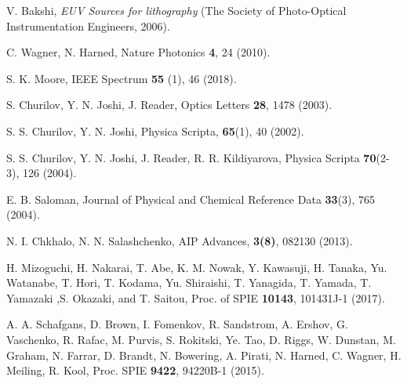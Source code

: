 \documentclass[aip, apl, amsmath,amssymb, reprint]{revtex4-1}
\begin{document}
\begin{thebibliography}{6}

%
V. Bakshi, \emph{EUV Sources for lithography} (The Society of Photo-Optical Instrumentation Engineers, 2006).

C. Wagner, N. Harned, Nature Photonics \textbf{4}, 24 (2010).

 S. K. Moore, IEEE Spectrum \textbf{55} (1), 46 (2018).

S. Churilov, Y. N. Joshi, J. Reader,  Optics Letters \textbf{28}, 1478 (2003).

S. S. Churilov, Y. N. Joshi, Physica Scripta, \textbf{65}(1), 40 (2002).

S. S. Churilov, Y. N. Joshi, J. Reader, R. R. Kildiyarova,  Physica Scripta \textbf{70}(2-3), 126 (2004).

E. B. Saloman, Journal of Physical and Chemical Reference Data \textbf{33}(3), 765 (2004).

N. I. Chkhalo, N. N. Salashchenko, AIP Advances, \textbf{3(8)}, 082130 (2013).


H. Mizoguchi, H. Nakarai, T. Abe, K. M. Nowak, Y. Kawasuji, H. Tanaka, Yu. Watanabe, T. Hori, T. Kodama, Yu. Shiraishi, T. Yanagida, T. Yamada, T. Yamazaki ,S. Okazaki, and T. Saitou, Proc. of SPIE \textbf{10143}, 101431J-1 (2017).

A. A. Schafgans, D. Brown, I. Fomenkov, R. Sandstrom, A. Ershov, G. Vaschenko, R. Rafac, M. Purvis, S. Rokitski, Ye. Tao, D. Riggs,
W. Dunstan, M. Graham, N. Farrar, D. Brandt, N. Bowering, A. Pirati, N. Harned, C. Wagner, H. Meiling, R. Kool, Proc. SPIE \textbf{9422}, 94220B-1 (2015).



\end{thebibliography}
\end{document}
